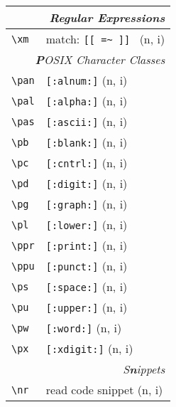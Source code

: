 \documentclass[oneside,11pt,a4paper,DIV18]{scrartcl}
\begin{document}
\begin{center}
\newpage 
\begin{tabular}[]{|p{11mm}|p{59mm}|}
\hline
\multicolumn{2}{|r|}{\textsl{Regular E\textbf{x}pressions}}\\
\hline \verb'\xm' & match: \verb'[[ =~ ]] '         \hfill (n, i)\\
\hline
\hline
\multicolumn{2}{|r|}{\textsl{\textbf{P}OSIX Character Classes}}\\
\hline \verb'\pan' &  \verb'[:alnum:]'         \hfill (n, i)\\
\hline \verb'\pal' &  \verb'[:alpha:]'         \hfill (n, i)\\
\hline \verb'\pas' &  \verb'[:ascii:]'         \hfill (n, i)\\
\hline \verb'\pb'  &  \verb'[:blank:]'         \hfill (n, i)\\
\hline \verb'\pc'  &  \verb'[:cntrl:]'         \hfill (n, i)\\
\hline \verb'\pd'  &  \verb'[:digit:]'         \hfill (n, i)\\
\hline \verb'\pg'  &  \verb'[:graph:]'         \hfill (n, i)\\
\hline \verb'\pl'  &  \verb'[:lower:]'         \hfill (n, i)\\
\hline \verb'\ppr' &  \verb'[:print:]'         \hfill (n, i)\\
\hline \verb'\ppu' &  \verb'[:punct:]'         \hfill (n, i)\\
\hline \verb'\ps'  &  \verb'[:space:]'         \hfill (n, i)\\
\hline \verb'\pu'  &  \verb'[:upper:]'         \hfill (n, i)\\
\hline \verb'\pw'  &  \verb'[:word:]'          \hfill (n, i)\\
\hline \verb'\px'  &  \verb'[:xdigit:]'        \hfill (n, i)\\
\hline
\hline
\multicolumn{2}{|r|}{\textsl{S\textbf{n}ippets}}\\
\hline \verb'\nr'  & read code snippet          \hfill (n, i)\\

\end{tabular}
\end{center}
\end{document}
